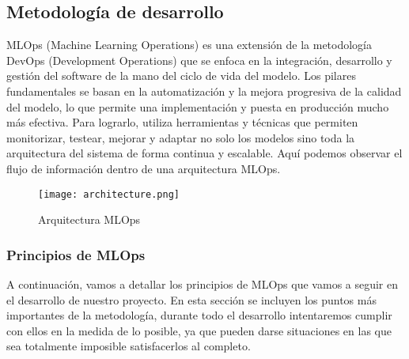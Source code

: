 \subsection{Metodología de desarrollo}
MLOps (Machine Learning Operations) es una extensión de la metodología DevOps (Development Operations)
que se enfoca en la integración, desarrollo y gestión del software de la mano del ciclo de vida del modelo.
Los pilares fundamentales se basan en la automatización y la mejora progresiva de la calidad del modelo,
lo que permite una implementación y puesta en producción mucho más efectiva. Para lograrlo, utiliza herramientas
y técnicas que permiten monitorizar, testear, mejorar y adaptar no solo los modelos sino toda la arquitectura
del sistema de forma continua y escalable. Aquí podemos observar el flujo de información dentro de una
arquitectura MLOps.

\begin{figure}[ht]
    \centering
    \texttt{[image: architecture.png]}
    \caption{Arquitectura MLOps}
    \label{fig:architecure-mlops}
\end{figure}

\subsubsection{Principios de MLOps}
A continuación, vamos a detallar los principios de MLOps que vamos a seguir en el desarrollo de nuestro proyecto.
En esta sección se incluyen los puntos más importantes de la metodología, durante todo el desarrollo intentaremos
cumplir con ellos en la medida de lo posible, ya que pueden darse situaciones en las que sea totalmente imposible
satisfacerlos al completo.

